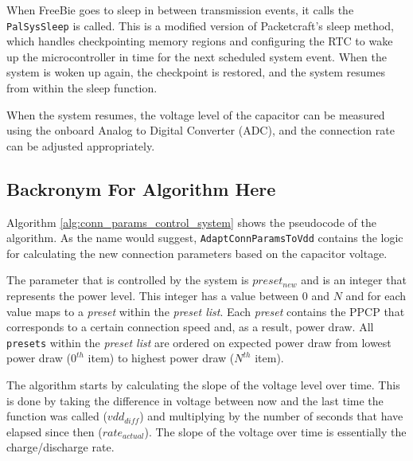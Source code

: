 When FreeBie goes to sleep in between transmission events, it calls the \texttt{PalSysSleep} is called. This is a modified version of Packetcraft's sleep method, which handles checkpointing memory regions and configuring the RTC to wake up the microcontroller in time for the next scheduled system event. When the system is woken up again, the checkpoint is restored, and the system resumes from within the sleep function. 

When the system resumes, the voltage level of the capacitor can be measured using the onboard Analog to Digital Converter (ADC), and the connection rate can be adjusted appropriately. 

\subsection{Backronym For Algorithm Here}
Algorithm \ref{alg:conn_params_control_system} shows the pseudocode of the algorithm. As the name would suggest, \texttt{AdaptConnParamsToVdd} contains the logic for calculating the new connection parameters based on the capacitor voltage. 

The parameter that is controlled by the system is $preset_{new}$ and is an integer that represents the power level. This integer has a value between $0$ and $N$ and for each value maps to a \textit{preset} within the \textit{preset list}. Each \textit{preset} contains the PPCP that corresponds to a certain connection speed and, as a result, power draw. All \texttt{presets} within the \textit{preset list} are ordered on expected power draw from lowest power draw ($0^{th}$ item) to highest power draw ($N^{th}$ item).

The algorithm starts by calculating the slope of the voltage level over time. This is done by taking the difference in voltage between now and the last time the function was called ($vdd_{diff}$) and multiplying by the number of seconds that have elapsed since then ($rate_{actual}$). The slope of the voltage over time is essentially the charge/discharge rate.

